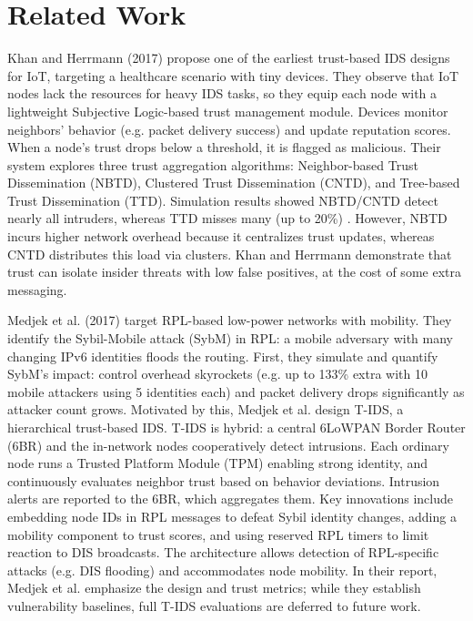 \documentclass[final,5p,times,twocolumn]{elsarticle}
\begin{document}
\section{Related Work}
Khan and Herrmann (2017) \cite{Khan2017} propose one of the earliest trust-based IDS designs for IoT, targeting a healthcare scenario with tiny devices. They observe that IoT nodes lack the resources for heavy IDS tasks, so they equip each node with a lightweight Subjective Logic-based trust management module. Devices monitor neighbors’ behavior (e.g. packet delivery success) and update reputation scores. When a node’s trust drops below a threshold, it is flagged as malicious. Their system explores three trust aggregation algorithms: Neighbor-based Trust Dissemination (NBTD), Clustered Trust Dissemination (CNTD), and Tree-based Trust Dissemination (TTD). Simulation results showed NBTD/CNTD detect nearly all intruders, whereas TTD misses many (up to 20\%) \cite{Khan2017}. However, NBTD incurs higher network overhead because it centralizes trust updates, whereas CNTD distributes this load via clusters. Khan and Herrmann demonstrate that trust can isolate insider threats with low false positives, at the cost of some extra messaging.

\vspace{0.5em}

Medjek et al. (2017) \cite{Medjek2017} target RPL-based low-power networks with mobility. They identify the Sybil-Mobile attack (SybM) in RPL: a mobile adversary with many changing IPv6 identities floods the routing. First, they simulate and quantify SybM’s impact: control overhead skyrockets (e.g. up to 133\% extra with 10 mobile attackers using 5 identities each) and packet delivery drops significantly as attacker count grows. Motivated by this, Medjek et al. design T-IDS, a hierarchical trust-based IDS. T-IDS is hybrid: a central 6LoWPAN Border Router (6BR) and the in-network nodes cooperatively detect intrusions. Each ordinary node runs a Trusted Platform Module (TPM) enabling strong identity, and continuously evaluates neighbor trust based on behavior deviations. Intrusion alerts are reported to the 6BR, which aggregates them. Key innovations include embedding node IDs in RPL messages to defeat Sybil identity changes, adding a mobility component to trust scores, and using reserved RPL timers to limit reaction to DIS broadcasts. The architecture allows detection of RPL-specific attacks (e.g. DIS flooding) and accommodates node mobility. In their report, Medjek et al. emphasize the design and trust metrics; while they establish vulnerability baselines, full T-IDS evaluations are deferred to future work.
\end{document}
